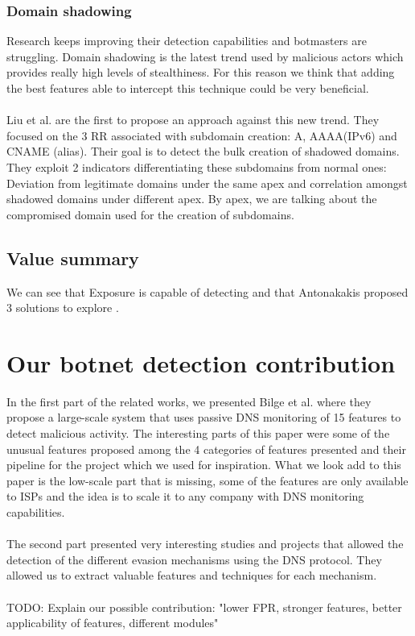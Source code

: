\subsubsection{Domain shadowing}
Research keeps improving their detection capabilities and botmasters are struggling. Domain shadowing is the latest trend used by malicious actors which provides really high levels of stealthiness. For this reason we think that adding the best features able to intercept this technique could be very beneficial.\\
\\
Liu et al. \cite{shadowing} are the first to propose an approach against this new trend. They focused on the 3 RR associated with subdomain creation: A, AAAA(IPv6) and CNAME (alias). Their goal is to detect the bulk creation of shadowed domains. They exploit 2 indicators differentiating these subdomains from normal ones: Deviation from legitimate domains under the same apex and correlation amongst shadowed domains under different apex. By apex, we are talking about the compromised domain used for the creation of subdomains.


\subsection{Value summary}
We can see that Exposure is capable of detecting and that Antonakakis proposed 3 solutions to explore .

\section{Our botnet detection contribution}
In the first part of the related works, we presented Bilge et al. \cite{exposure} where they propose a large-scale system that uses passive DNS monitoring of 15 features to detect malicious activity. The interesting parts of this paper were some of the unusual features proposed among the 4 categories of features presented and their pipeline for the project which we used for inspiration. What we look add to this paper is the low-scale part that is missing, some of the features are only available to ISPs and the idea is to scale it to any company with DNS monitoring capabilities.\\
\\
The second part presented very interesting studies and projects that allowed the detection of the different evasion mechanisms using the DNS protocol. They allowed us to extract valuable features and techniques for each mechanism. \\
\\ 
TODO: Explain our possible contribution: 
"lower FPR, stronger features, better applicability of features, different modules"